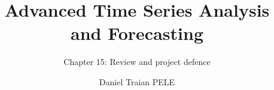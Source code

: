 \title[Advanced Time Series Analysis and Forecasting]{Advanced Time Series Analysis and Forecasting}
\subtitle{Chapter 15: Review and project defence}
\author[D.T. Pele]{Daniel Traian PELE}
\date{}

\providecommand{\atsapplink}[3]{\hypertarget{#2}{}\hyperlink{#1}{\beamergotobutton{#3}}}  %
\providecommand{\atsappback}[2]{\begin{tikzpicture}[remember picture,overlay]\node[anchor=south east] at ([xshift=-3mm,yshift=7mm]current page.south east){\hyperlink{#1}{\beamerreturnbutton{#2}}};\end{tikzpicture}}  %
\providecommand{\atschlink}[2]{\href{#1}{#2}}  %
\providecommand{\atschlinkt}[2]{\href{#1}{\usebeamercolor[fg]{frametitle}#2}}  %


